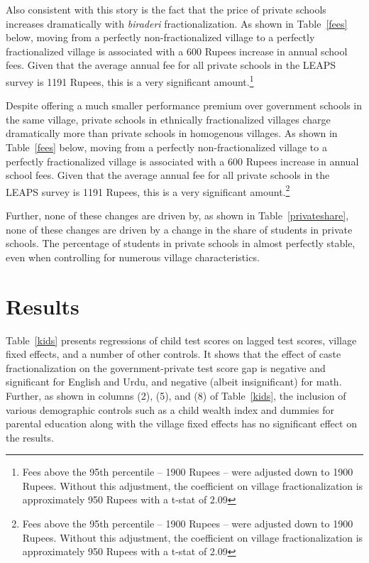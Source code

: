 \documentclass[12pt]{article}
\begin{document}


Also consistent with this story is the fact that the price of private schools increases dramatically with \emph{biraderi} fractionalization. As shown in Table~\ref{fees} below, moving from a perfectly non-fractionalized village to a perfectly fractionalized village is associated with a 600 Rupees increase in annual school fees. Given that the average annual fee for all private schools in the LEAPS survey is 1191 Rupees, this is a very significant amount.\footnote{Fees above the 95th percentile -- 1900 Rupees -- were adjusted down to 1900 Rupees. Without this adjustment, the coefficient on village fractionalization is approximately 950 Rupees with a t-stat of 2.09} 




Despite offering a much smaller performance premium over government schools in the same village, private schools in ethnically fractionalized villages charge dramatically more than private schools in homogenous villages. As shown in Table~\ref{fees} below, moving from a perfectly non-fractionalized village to a perfectly fractionalized village is associated with a 600 Rupees increase in annual school fees. Given that the average annual fee for all private schools in the LEAPS survey is 1191 Rupees, this is a very significant amount.\footnote{Fees above the 95th percentile -- 1900 Rupees -- were adjusted down to 1900 Rupees. Without this adjustment, the coefficient on village fractionalization is approximately 950 Rupees with a t-stat of 2.09} 

Further, none of these changes are driven by, as shown in Table~\ref{privateshare}, none of these changes are driven by a change in the share of students in private schools. The percentage of students in private schools in almost perfectly stable, even when controlling for numerous village characteristics. 





\section{Results}\label{results}
Table~\ref{kids} presents regressions of child test scores on lagged test scores, village fixed effects, and a number of other controls. It shows that the effect of caste fractionalization on the government-private test score gap is negative and significant for English and Urdu, and negative (albeit insignificant) for math. Further, as shown in columns (2), (5), and (8) of Table~\ref{kids}, the inclusion of various demographic controls such as a child wealth index and dummies for parental education along with the village fixed effects has no significant effect on the results. 
\end{document}
